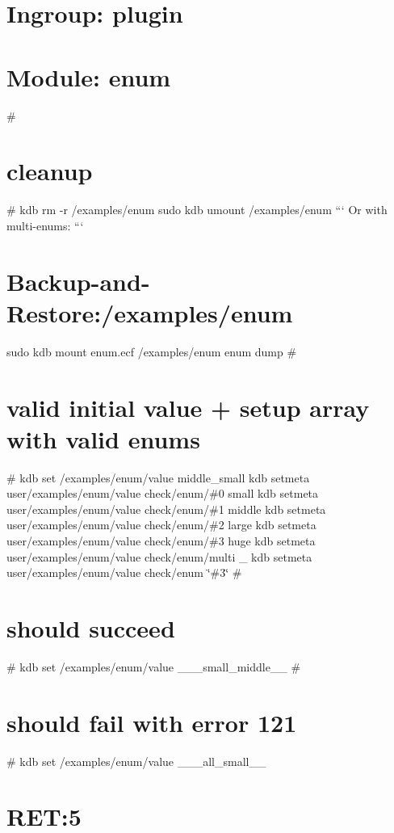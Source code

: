 \section*{Ingroup\+: plugin}

\section*{Module\+: enum}

\# \section*{cleanup}

\# kdb rm -\/r /examples/enum sudo kdb umount /examples/enum ``` Or with multi-\/enums\+: ``` \section*{Backup-\/and-\/\+Restore\+:/examples/enum}

sudo kdb mount enum.\+ecf /examples/enum enum dump \# \section*{valid initial value + setup array with valid enums}

\# kdb set /examples/enum/value middle\+\_\+small kdb setmeta user/examples/enum/value check/enum/\#0 small kdb setmeta user/examples/enum/value check/enum/\#1 middle kdb setmeta user/examples/enum/value check/enum/\#2 large kdb setmeta user/examples/enum/value check/enum/\#3 huge kdb setmeta user/examples/enum/value check/enum/multi \+\_\+ kdb setmeta user/examples/enum/value check/enum \char`\"{}\#3\char`\"{} \# \section*{should succeed}

\# kdb set /examples/enum/value \+\_\+\+\_\+\+\_\+small\+\_\+middle\+\_\+\+\_\+ \# \section*{should fail with error 121}

\# kdb set /examples/enum/value \+\_\+\+\_\+\+\_\+all\+\_\+small\+\_\+\+\_\+ \section*{R\+E\+T\+:5}

